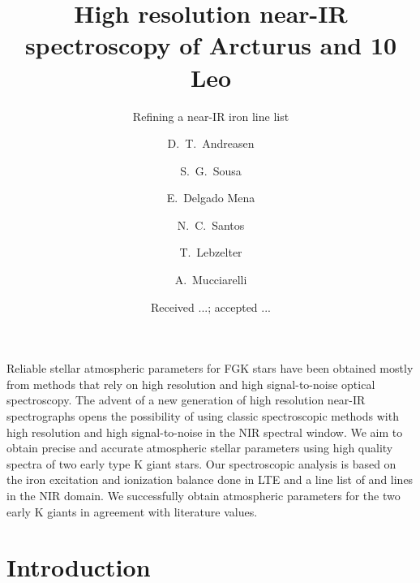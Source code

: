 \documentclass{aa}
\begin{document}
\title{High resolution near-IR spectroscopy of Arcturus and 10 Leo}
\subtitle{Refining a near-IR iron line list}


\author{ D.~T.~Andreasen
    \and S.~G.~Sousa
    \and E.~Delgado Mena
    \and N.~C.~Santos
    \and T.~Lebzelter
    \and A.~Mucciarelli}







\date{Received ...; accepted ...}

\abstract
{Reliable stellar atmospheric parameters for FGK stars have been obtained mostly
from methods that rely on high resolution and high signal-to-noise optical
spectroscopy. The advent of a new generation of high resolution near-IR
spectrographs opens the possibility of using classic spectroscopic methods with
high resolution and high signal-to-noise in the NIR spectral window.}
{We aim to obtain precise and accurate atmospheric stellar parameters using
high quality spectra of two early type K giant stars.}
{Our spectroscopic analysis is based on the iron excitation and ionization
balance done in LTE and a line list of  and  lines in the
NIR domain.}
{We successfully obtain atmospheric parameters for the two early K giants in
agreement with literature values.}
{}



\maketitle



\section{Introduction}
\label{sec:introduction}
\end{document}
